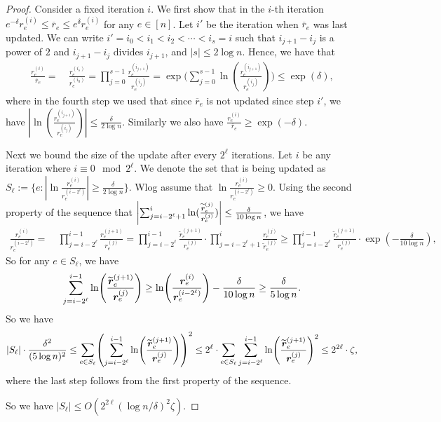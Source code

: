 \documentclass[11pt]{article}
\let\originalleft\left
\let\originalright\right
\renewcommand{\left}{\mathopen{}\mathclose\bgroup\originalleft}
\renewcommand{\right}{\aftergroup\egroup\originalright}
\newcommand\rr{\boldsymbol{\mathit{r}}}
\newcommand{\wt}{\widetilde}
\newcommand{\ov}{\overline}
\begin{document}
\begin{proof}
Consider a fixed iteration $i$. We first show that in the $i$-th iteration $e^{-\delta} \rr^{(i)}_e \leq \ov{\rr}_e \leq e^{\delta} \rr^{(i)}_e$ for any $e \in [n]$. Let $i'$ be the iteration when $\ov{\rr}_e$ was last updated. We can write $i' = i_{0} < i_{1} < i_{2}< \cdots < i_{s} = i$ such that $i_{j+1} - i_{j}$ is a power of $2$ and $i_{j+1} - i_{j}$ divides $i_{j+1}$, and $|s| \leq 2 \log n$.
Hence, we have that
\begin{align*}
\frac{\rr_e^{(i)}}{\ov{\rr}_e} = &~ \frac{\rr_e^{(i_s)}}{\rr_e^{(i_0)}} 
= \prod_{j=0}^{s-1} \frac{\rr_e^{(i_{j+1})}}{\rr_e^{(i_j)}}
= \exp\Big(\sum_{j=0}^{s-1} \ln(\frac{\rr_e^{(i_{j+1})}}{\rr_e^{(i_j)}})\Big) \leq \exp(\delta),
\end{align*}
where in the fourth step we used that since $\ov{\rr}_{e}$ is not updated since step $i'$, we have $|\ln(\frac{\rr_e^{(i_{j+1})}}{\rr_e^{(i_j)}})| \leq \frac{\delta}{2 \log n}$. Similarly we also have $\frac{\rr_e^{(i)}}{\ov{\rr}_e} \geq \exp(-\delta)$.

Next we bound the size of the update after every $2^{\ell}$ iterations. Let $i$ be any iteration where $i \equiv 0 \mod 2^{\ell}$. We denote the set that is being updated as $S_{\ell} := \{e : |\ln \frac{\rr_e^{(i)}}{\rr_e^{(i-2^\ell)}} | \geq \frac{\delta}{2 \log n}\}$. Wlog assume that $\ln \frac{\rr_e^{(i)}}{\rr_e^{(i-2^\ell)}} \geq 0$. Using the second property of the sequence that $\left|\sum_{j = i-2^{\ell}+1}^{i} \ln(\frac{\wt{\rr}_e^{(j)}}{\rr_e^{(j)}})\right| \leq \frac{\delta}{10 \log n}$, we have
\begin{align*}
\frac{\rr_e^{(i)}}{\rr_e^{(i-2^\ell)}} = &~ \prod_{j=i-2^{\ell}}^{i-1} \frac{\rr_e^{(j+1)}}{\rr_e^{(j)}}
= \prod_{j=i-2^{\ell}}^{i-1} \frac{\wt{\rr}_e^{(j+1)}}{\rr_e^{(j)}} \cdot \prod_{j=i-2^{\ell}+1}^{i} \frac{\rr_e^{(j)}}{\wt{\rr}_e^{(j)}} \geq \prod_{j=i-2^{\ell}}^{i-1} \frac{\wt{\rr}_e^{(j+1)}}{\rr_e^{(j)}} \cdot \exp(-\frac{\delta}{10 \log n}),
\end{align*}
So for any $e \in S_{\ell}$, we have 
\begin{align*}
\sum_{j=i-2^{\ell}}^{i-1} \ln\left(\frac{\wt{\rr}_e^{(j+1)}}{\rr_e^{(j)}} \right) \geq \ln \left(\frac{\rr_e^{(i)}}{\rr_e^{(i-2^\ell)}}\right) - \frac{\delta}{10 \log n} \geq \frac{\delta}{5 \log n}.
\end{align*}
So we have
\begin{align*}
|S_{\ell}| \cdot \frac{\delta^2}{(5 \log n)^2} 
\leq \sum_{e \in S_{\ell}} \left(\sum_{j=i-2^{\ell}}^{i-1} \ln\left(\frac{\wt{\rr}_e^{(j+1)}}{\rr_e^{(j)}} \right)\right)^2 
\leq 2^{\ell} \cdot \sum_{e \in S_{\ell}} \sum_{j=i-2^{\ell}}^{i-1} \ln\left(\frac{\wt{\rr}_e^{(j+1)}}{\rr_e^{(j)}} \right)^2
\leq 2^{2 \ell} \cdot \zeta,
\end{align*}
where the last step follows from the first property of the sequence.

So we have $|S_{\ell}| \leq O(2^{2\ell}(\log n/\delta)^{2} \zeta)$.
\end{proof}
\end{document}
